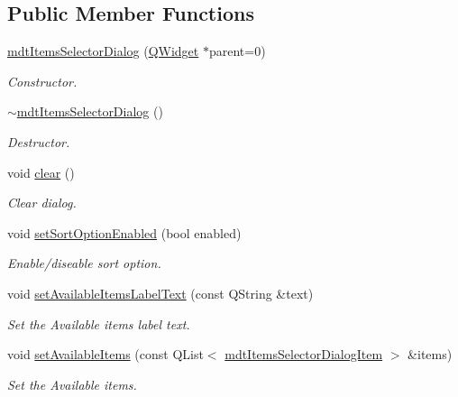 \subsection*{Public Member Functions}
\begin{DoxyCompactItemize}
\item 
\hyperlink{classmdt_items_selector_dialog_abfe9a59eba04870635aff550e16a1e5b}{mdt\-Items\-Selector\-Dialog} (\hyperlink{class_q_widget}{Q\-Widget} $\ast$parent=0)
\begin{DoxyCompactList}\small\item\em Constructor. \end{DoxyCompactList}\item 
\hyperlink{classmdt_items_selector_dialog_a88d371fd132aaa5c67896ffc5c208d57}{$\sim$mdt\-Items\-Selector\-Dialog} ()
\begin{DoxyCompactList}\small\item\em Destructor. \end{DoxyCompactList}\item 
void \hyperlink{classmdt_items_selector_dialog_aa1746eb2921490ade4d7a0abd97a5ecd}{clear} ()
\begin{DoxyCompactList}\small\item\em Clear dialog. \end{DoxyCompactList}\item 
void \hyperlink{classmdt_items_selector_dialog_a831eda8f00130744ac60d324d61f3687}{set\-Sort\-Option\-Enabled} (bool enabled)
\begin{DoxyCompactList}\small\item\em Enable/diseable sort option. \end{DoxyCompactList}\item 
void \hyperlink{classmdt_items_selector_dialog_a05cf055e72c2d86a2cc7eb92afdcddbb}{set\-Available\-Items\-Label\-Text} (const Q\-String \&text)
\begin{DoxyCompactList}\small\item\em Set the Available items label text. \end{DoxyCompactList}\item 
void \hyperlink{classmdt_items_selector_dialog_ab13a8151fb748f08aebe743b5a5976b6}{set\-Available\-Items} (const Q\-List$<$ \hyperlink{classmdt_items_selector_dialog_item}{mdt\-Items\-Selector\-Dialog\-Item} $>$ \&items)
\begin{DoxyCompactList}\small\item\em Set the Available items. \end{DoxyCompactList}\item 

\end{DoxyCompactItemize}
